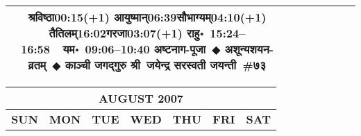 \documentclass[a3paper,12pt,landscape]{article}
\newcommand{\eventsep}{~$\Diamondblack$ }
\newcommand{\To}{\hspace{1pt}\raisebox{0pt}{\tiny\RIGHTarrow}\hspace{1pt}}
\newcommand{\rahuyama}[2]{%
{राहु॰~\textsf{#1}~~यम॰~\textsf{#2}}
}
\begin{document}
\begin{center}
\begin{tabular}{|c|c|c|c|c|c|c|}
{{\mbox{श्रविष्ठा\To{}\textsf{00:15(+1)\hspace{2ex}}}}%
{\mbox{आयुष्मान्\To{}\textsf{06:39\hspace{2ex}}}\mbox{सौभाग्यम्\To{}\textsf{04:10(+1)\hspace{2ex}}}}%
{\mbox{तैतिलम्\To{}\textsf{16:02\hspace{2ex}}}\mbox{गरजा\To{}\textsf{03:07(+1)\hspace{2ex}}}}}%
{\rahuyama{15:24--16:58}{09:06--10:40}}%
{अष्टनाग-पूजा\eventsep अशून्यशयन-व्रतम्\eventsep काञ्ची जगद्गुरु श्री~जयेन्द्र सरस्वती जयन्ती~\#{७३}}
&
\mbox{}  & %
\mbox{}  & %
\mbox{}  & %
\\ \hline
\end{tabular}



\begin{tabular}{|c|c|c|c|c|c|c|}
\multicolumn{7}{c}{\Large \bfseries \sffamily AUGUST 2007}\\[3mm]
\hline
\textbf{\textsf{SUN}} & \textbf{\textsf{MON}} & \textbf{\textsf{TUE}} & \textbf{\textsf{WED}} & \textbf{\textsf{THU}} & \textbf{\textsf{FRI}} & \textbf{\textsf{SAT}} \\ \hline


\end{tabular}
\end{center}
\end{document}
